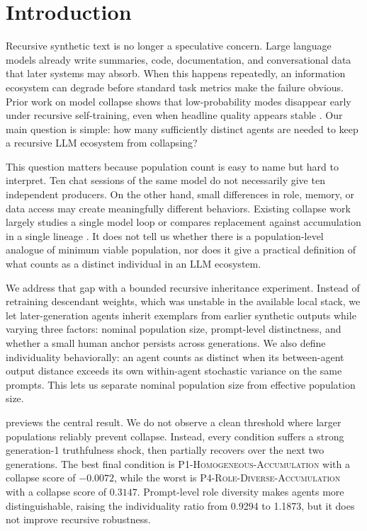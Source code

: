 \section{Introduction}
\label{sec:introduction}

Recursive synthetic text is no longer a speculative concern. Large language models already write summaries, code, documentation, and conversational data that later systems may absorb. When this happens repeatedly, an information ecosystem can degrade before standard task metrics make the failure obvious. Prior work on model collapse shows that low-probability modes disappear early under recursive self-training, even when headline quality appears stable \cite{shumailov2023curse,briesch2023large}. Our main question is simple: how many sufficiently distinct agents are needed to keep a recursive LLM ecosystem from collapsing?

This question matters because population count is easy to name but hard to interpret. Ten chat sessions of the same model do not necessarily give ten independent producers. On the other hand, small differences in role, memory, or data access may create meaningfully different behaviors. Existing collapse work largely studies a single model loop or compares replacement against accumulation in a single lineage \cite{alemohammad2023self,gillman2024selfcorrecting,gerstgrasser2024model}. It does not tell us whether there is a population-level analogue of minimum viable population, nor does it give a practical definition of what counts as a distinct individual in an LLM ecosystem.

We address that gap with a bounded recursive inheritance experiment. Instead of retraining descendant weights, which was unstable in the available local stack, we let later-generation agents inherit exemplars from earlier synthetic outputs while varying three factors: nominal population size, prompt-level distinctness, and whether a small human anchor persists across generations. We also define individuality behaviorally: an agent counts as distinct when its between-agent output distance exceeds its own within-agent stochastic variance on the same prompts. This lets us separate nominal population size from effective population size.

 previews the central result. We do not observe a clean threshold where larger populations reliably prevent collapse. Instead, every condition suffers a strong generation-1 truthfulness shock, then partially recovers over the next two generations. The best final condition is \textsc{P1-Homogeneous-Accumulation} with a collapse score of $-0.0072$, while the worst is \textsc{P4-Role-Diverse-Accumulation} with a collapse score of $0.3147$. Prompt-level role diversity makes agents more distinguishable, raising the individuality ratio from 0.9294 to 1.1873, but it does not improve recursive robustness.

